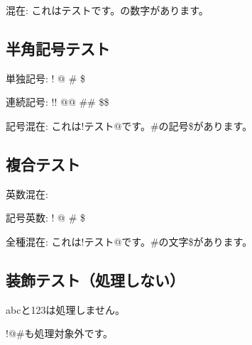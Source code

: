 混在:
これはテストです。{\small{}}の数字{\small{}}があります。

\hypertarget{ux534aux89d2ux8a18ux53f7ux30c6ux30b9ux30c8}{%
\subsection{半角記号テスト}\label{ux534aux89d2ux8a18ux53f7ux30c6ux30b9ux30c8}}

単独記号: ! @ \# \$

連続記号: !! @@ \#\# \$\$

記号混在: これは!テスト@です。\#の記号\$があります。

\hypertarget{ux8907ux5408ux30c6ux30b9ux30c8}{%
\subsection{複合テスト}\label{ux8907ux5408ux30c6ux30b9ux30c8}}

英数混在: 
 

記号英数: ! @ \#
\$

全種混在:
これは!テスト@です。\#の文字\$があります。

\hypertarget{htmlux88c5ux98feux30c6ux30b9ux30c8ux51e6ux7406ux3057ux306aux3044}{%
\subsection{\texorpdfstring{装飾テスト（処理しない）}{装飾テスト（処理しない）}}\label{htmlux88c5ux98feux30c6ux30b9ux30c8ux51e6ux7406ux3057ux306aux3044}}

{abc}と{123}は処理しません。

{!@\#}も処理対象外です。

